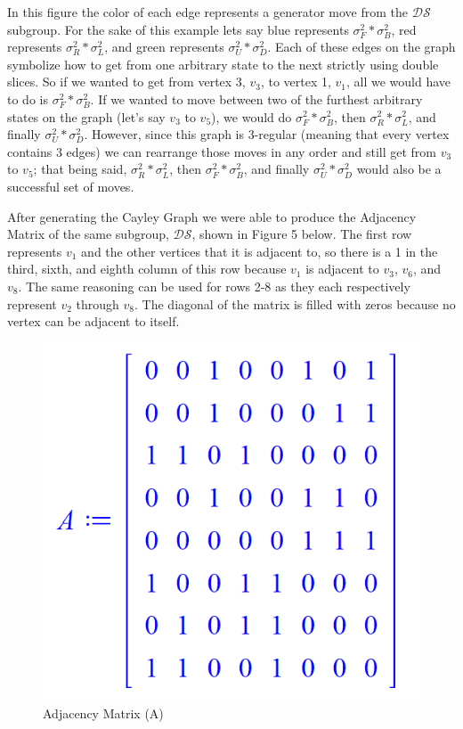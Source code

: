 \documentclass{article}
\begin{document}
In this figure the color of each edge represents a generator move from the $\mathcal{DS}$ subgroup.  For the sake of this example lets say blue represents $\sigma_F^2 * \sigma_B^2$, red represents $\sigma_R^2 * \sigma_L^2$, and green represents $\sigma_U^2 * \sigma_D^2$.  Each of these edges on the graph symbolize how to get from one arbitrary state to the next strictly using double slices.  So if we wanted to get from vertex 3, $v_3$, to vertex 1, $v_1$, all we would have to do is $\sigma_{F}^2 * \sigma_{B}^2$.  If we wanted to move between two of the furthest arbitrary states on the graph (let's say $v_3$ to $v_5$), we would do $\sigma_F^2 * \sigma_B^2$, then $\sigma_R^2 * \sigma_L^2$, and finally $\sigma_U^2 * \sigma_D^2$.  However, since this graph is 3-regular (meaning that every vertex contains 3 edges) we can rearrange those moves in any order and still get from $v_3$ to $v_5$; that being said, $\sigma_R^2 * \sigma_L^2$, then $\sigma_F^2 * \sigma_B^2$, and finally $\sigma_U^2 * \sigma_D^2$ would also be a successful set of moves.  

After generating the Cayley Graph we were able to produce the Adjacency Matrix of the same subgroup, $\mathcal{DS}$, shown in Figure 5 below.  The first row represents $v_1$ and the other vertices that it is adjacent to, so there is a 1 in the third, sixth, and eighth column of this row because $v_1$ is adjacent to $v_3$, $v_6$, and $v_8$.  The same reasoning can be used for rows 2-8 as they each respectively represent $v_2$ through $v_8$.  The diagonal of the matrix is filled with zeros because no vertex can be adjacent to itself.   

\begin{figure}[ht]
    \centering
        \includegraphics[scale=0.9]{images/AdjancencyMatrix.png}
        \caption{Adjacency Matrix (A)}
\end{figure}
\end{document}
